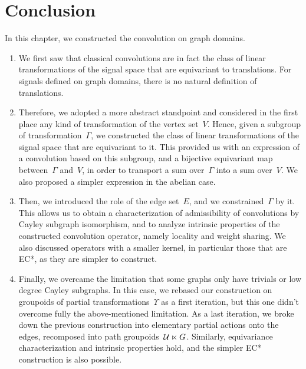 \section{Conclusion}
\label{sec:2.5}

In this chapter, we constructed the convolution on graph domains.

\begin{enumerate}
\item We first saw that classical convolutions are in fact the class of linear transformations of the signal space that are equivariant to translations. For signals defined on graph domains, there is no natural definition of translations.
\item Therefore, we adopted a more abstract standpoint and considered in the first place any kind of transformation of the vertex set~$V$. Hence, given a subgroup of transformation~$\Gamma$, we constructed the class of linear transformations of the signal space that are equivariant to it. This provided us with an expression of a convolution based on this subgroup, and a bijective equivariant map between~$\Gamma$ and~$V$, in order to transport a sum over~$\Gamma$ into a sum over~$V$. We also proposed a simpler expression in the abelian case.
\item Then, we introduced the role of the edge set~$E$, and we constrained~$\Gamma$ by it. This allows us to obtain a characterization of admissibility of convolutions by Cayley subgraph isomorphism, and to analyze intrinsic properties of the constructed convolution operator, namely locality and weight sharing. We also discussed operators with a smaller kernel, in particular those that are EC*, as they are simpler to construct.
\item Finally, we overcame the limitation that some graphs only have trivials or low degree Cayley subgraphs. In this case, we rebased our construction on groupoids of partial transformations~$\Upsilon$ as a first iteration, but this one didn't overcome fully the above-mentioned limitation. As a last iteration, we broke down the previous construction into elementary partial actions onto the edges, recomposed into path groupoids~$\mathcal{U} \ltimes G$. Similarly, equivariance characterization and intrinsic properties hold, and the simpler EC* construction is also possible.
\end{enumerate}

